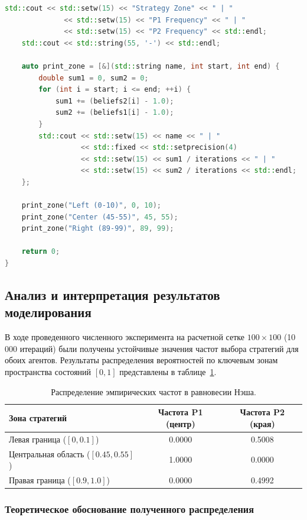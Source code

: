 \begin{lstlisting}[language=C++, caption={Аппроксимация непрерывного пространства сеткой 100x100}, label={lst:fictitious_play_100x100}]
    std::cout << std::setw(15) << "Strategy Zone" << " | "
              << std::setw(15) << "P1 Frequency" << " | "
              << std::setw(15) << "P2 Frequency" << std::endl;
    std::cout << std::string(55, '-') << std::endl;

    auto print_zone = [&](std::string name, int start, int end) {
        double sum1 = 0, sum2 = 0;
        for (int i = start; i <= end; ++i) {
            sum1 += (beliefs2[i] - 1.0); 
            sum2 += (beliefs1[i] - 1.0);
        }
        std::cout << std::setw(15) << name << " | "
                  << std::fixed << std::setprecision(4)
                  << std::setw(15) << sum1 / iterations << " | "
                  << std::setw(15) << sum2 / iterations << std::endl;
    };

    print_zone("Left (0-10)", 0, 10);
    print_zone("Center (45-55)", 45, 55);
    print_zone("Right (89-99)", 89, 99);
    
    return 0;
}
\end{lstlisting}

\subsection{Анализ и интерпретация результатов моделирования}

В ходе проведенного численного эксперимента на расчетной сетке $100 \times 100$ (10 000 итераций) были получены устойчивые значения частот выбора стратегий для обоих агентов. Результаты распределения вероятностей по ключевым зонам пространства состояний $[0, 1]$ представлены в таблице~\ref{tab:results}.

\begin{table}[h]
\centering
\begin{tabular}{|l|c|c|}
\hline
\textbf{Зона стратегий} & \textbf{Частота P1 (центр)} & \textbf{Частота P2 (края)} \\ \hline
Левая граница ($[0, 0.1]$) & 0.0000 & 0.5008 \\ \hline
Центральная область ($[0.45, 0.55]$) & 1.0000 & 0.0000 \\ \hline
Правая граница ($[0.9, 1.0]$) & 0.0000 & 0.4992 \\ \hline
\end{tabular}
\caption{Распределение эмпирических частот в равновесии Нэша.}
\label{tab:results}
\end{table}

\subsubsection*{Теоретическое обоснование полученного распределения}

